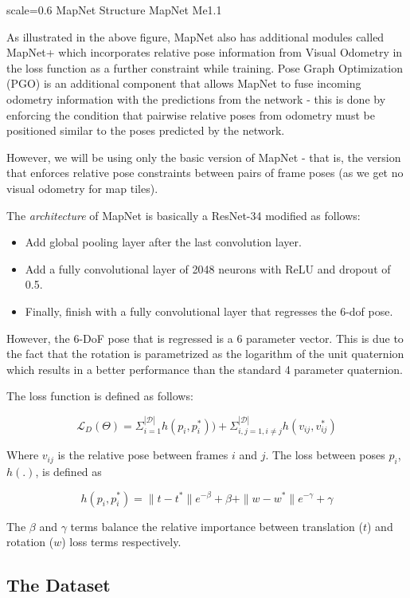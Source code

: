 {scale=0.6}%
{MapNet Structure}%
{MapNet}%
{Me1.1}

As illustrated in the above figure, MapNet also has additional modules called MapNet+ which incorporates relative pose information from Visual Odometry in the loss function as a further constraint while training. Pose Graph Optimization (PGO) is an additional component that allows MapNet to fuse incoming odometry information with the predictions from the network - this is done by enforcing the condition that pairwise relative poses from odometry must be positioned similar to the poses predicted by the network.

However, we will be using only the basic version of MapNet - that is, the version 
that enforces relative pose constraints between pairs of frame poses (as we get no visual odometry for map tiles).

The \textit{architecture} of MapNet is basically a ResNet-34 modified as follows:
\begin{itemize}
	\item Add global pooling layer after the last convolution layer.
	\item Add a fully convolutional layer of 2048 neurons with ReLU and dropout of 0.5.
	\item Finally, finish with a fully convolutional layer that regresses the 6-dof pose. 
\end{itemize} 

However, the 6-DoF pose that is regressed is a 6 parameter vector. This is due to the fact that the rotation is parametrized as the logarithm of the unit quaternion which results in a better performance than the standard 4 parameter quaternion. 

The loss function is defined as follows:

\[ \mathcal{L}_D(\Theta)= \Sigma_{i=1}^{|\mathcal{D}|}h(p_i,p_i^{*})) + \Sigma_{i,j=1, i\neq j}^{|\mathcal{D}|}h(v_{ij},v_{ij}^{*}) \] 

Where $v_{ij}$ is the relative pose between frames $i$ and $j$. The loss between poses $p_i$, $h(.)$, is defined as

\[ h(p_i,p_i^{*}) = \|t - t^*\|e^{-\beta} + \beta + \|w - w^*\|e^{-\gamma} + \gamma \]

The $\beta$ and $\gamma$ terms balance the relative importance between translation ($t$) and rotation ($w$) loss terms respectively. 

\subsection{The Dataset}

